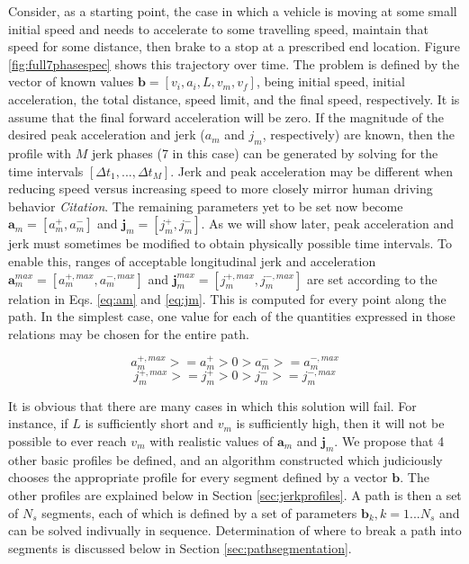 \documentclass[letterpaper, 10 pt, conference]{ieeeconf}  %
\begin{document}
Consider, as a starting point, the case in which a vehicle is moving at some small initial speed and needs to accelerate to some travelling speed, maintain that speed for some distance, then brake to a stop at a prescribed end location.
Figure \ref{fig:full7phasespec} shows this trajectory over time.
The problem is defined by the vector of known values $\mathbf{b}  = [v_i, a_i, L, v_m, v_f]$, being initial speed, initial acceleration, the total distance, speed limit, and the final speed, respectively.
It is assume that the final forward acceleration will be zero.
If the magnitude of the desired peak acceleration and jerk ($a_m$ and $j_m$, respectively) are known, then the profile with $M$ jerk phases (7 in this case) can be generated by solving for the time intervals $[\Delta t_1, ..., \Delta t_M]$.
Jerk and peak acceleration may be different when reducing speed versus increasing speed to more closely mirror human driving behavior \emph{Citation}.
The remaining parameters yet to be set now become $\mathbf{a}_m = [a^+_m , a^-_m]$ and $\mathbf{j}_m = [j^+_m , j^-_m]$.
As we will show later, peak acceleration and jerk must sometimes be modified to obtain physically possible time intervals.
To enable this, ranges of acceptable longitudinal jerk and acceleration $\mathbf{a}^{max}_m = [a^{+,max}_m , a^{-,max}_m]$ and $\mathbf{j}^{max}_m = [j^{+,max}_m , j^{-,max}_m]$ are set according to the relation in Eqs. \ref{eq:am} and \ref{eq:jm}.
This is computed for every point along the path.
In the simplest case, one value for each of the quantities expressed in those relations may be chosen for the entire path.

\begin{equation}
  a^{+,max}_m >= a^+_m > 0 > a^-_m >= a^{-,max}_m
  \label{eq:am}
\end{equation}
\begin{equation}
  j^{+,max}_m >= j^+_m > 0 > j^-_m >= j^{-,max}_m
  \label{eq:jm}
\end{equation}

It is obvious that there are many cases in which this solution will fail.
For instance, if $L$ is sufficiently short and $v_m$ is sufficiently high, then it will not be possible to ever reach $v_m$ with realistic values of $\mathbf{a}_m$ and $\mathbf{j}_m$.
We propose that 4 other basic profiles be defined, and an algorithm constructed which judiciously chooses the appropriate profile for every segment defined by a vector $\mathbf{b}$.
The other profiles are explained below in Section \ref{sec:jerkprofiles}.
A path is then a set of $N_s$ segments, each of which is defined by a set of parameters $\mathbf{b}_k, k = 1 ... N_s$ and can be solved indivually in sequence.
Determination of where to break a path into segments is discussed below in Section \ref{sec:pathsegmentation}.
\end{document}
